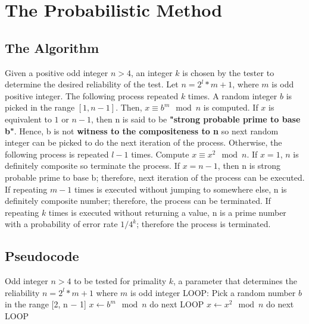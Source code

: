 \documentclass[conference]{IEEEtran}
\begin{document}
\section{The Probabilistic Method}
\subsection{The Algorithm}\label{AA}
Given a positive odd integer $n>4$, an integer $k$ is chosen by the tester to determine the desired reliability of the test. Let $n = 2^l*m+1$, where $m$ is odd positive integer. The following process repeated $k$ times. A random integer $b$ is picked in the range $[1,n-1]$. Then, $x \equiv b^m\mod{n}$ is computed. If $x$ is equivalent to  $1$ or $n-1$, then n is said to be \textbf{"strong probable prime to base b"}. Hence, b is not \textbf{witness to the compositeness to n} so next random integer can be picked to do the next iteration of the process. Otherwise,  the following process is repeated $l-1$ times. Compute $x \equiv x^2\mod{n}$. If $x=1$, $n$ is definitely composite so terminate the process. If $x=n-1$, then n is strong probable prime to base b; therefore, next iteration of the process can be executed. If repeating $m-1$ times is executed without jumping to somewhere else, n is definitely composite number; therefore, the process can be terminated. If repeating $k$ times is executed without returning a value, n is a prime number with a probability of error rate $1/4^k$; therefore the process is terminated.

\subsection*{Pseudocode}

\begin{algorithm}
\begin{algorithmic}
\REQUIRE Odd integer $n>4$ to be  tested for primality
\REQUIRE $k$, a parameter that determines the reliability 
\ENSURE  $n = 2^l*m+1$ where $m$ is odd integer
\STATE LOOP: 
\REPEAT
    \STATE Pick a random number $b$ in the range [2, n − 1]
    \STATE $x \leftarrow   b^m \mod{ n}$
        \STATE do next LOOP
    \ENDIF
    \REPEAT
        \STATE $x \leftarrow   x^2 \mod{ n}$
        \ENDIF
            \STATE do next LOOP
        \ENDIF



\end{algorithmic}
\end{algorithm}
\end{document}

